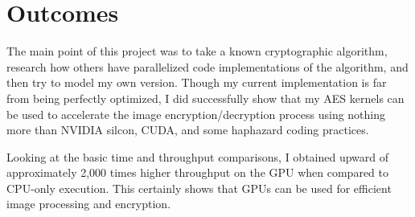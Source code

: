 \section{Outcomes}
The main point of this project was to take a known cryptographic algorithm, research how others have parallelized code implementations of the algorithm, and then try to model my own version. Though my current implementation is far from being perfectly optimized, I did successfully show that my AES kernels can be used to accelerate the image encryption/decryption process using nothing more than NVIDIA silcon, CUDA, and some haphazard coding practices. 

Looking at the basic time and throughput comparisons, I obtained upward of approximately 2,000 times higher throughput on the GPU when compared to CPU-only execution. This certainly shows that GPUs can be used for efficient image processing and encryption.

\hrulefill
